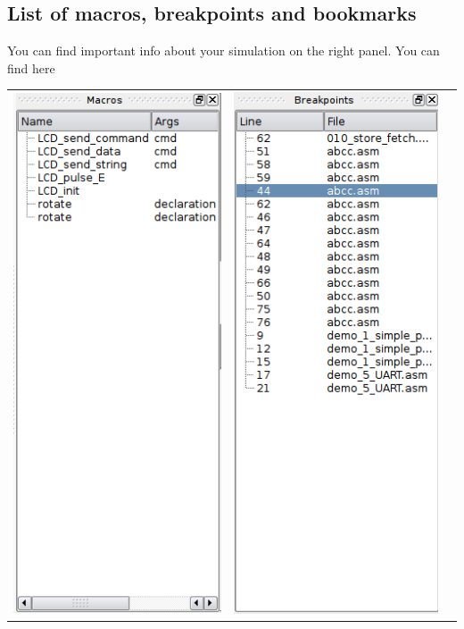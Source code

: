    \subsection{List of macros, breakpoints and bookmarks}
        You can find important info about your simulation on the right panel. You can find here
    \begin{table}[h!]
        \begin{tabular}{ccc}
            \includegraphics[width=.3\textwidth]{img/NewImg/listmacros.png}
                &
            \includegraphics[width=.3\textwidth]{img/NewImg/listbreakpoints.png}
                &

\end{tabular}
\end{table}
